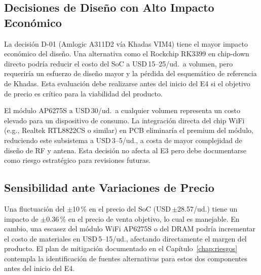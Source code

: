 \subsection{Decisiones de Diseño con Alto Impacto Económico}

\begin{decisbox}
  La decisión D-01 (Amlogic A311D2 vía Khadas VIM4) tiene el mayor impacto
  económico del diseño. Una alternativa como el Rockchip RK3399 en chip-down
  directo podría reducir el costo del SoC a USD\,15--25/ud.~a volumen, pero
  requeriría un esfuerzo de diseño mayor y la pérdida del esquemático de
  referencia de Khadas. Esta evaluación debe realizarse antes del inicio del
  E4 si el objetivo de precio es crítico para la viabilidad del producto.
\end{decisbox}

\begin{decisbox}
  El módulo AP6275S a USD\,30/ud.~a cualquier volumen representa un costo
  elevado para un dispositivo de consumo. La integración directa del chip
  WiFi (e.g., Realtek RTL8822CS o similar) en PCB eliminaría el premium del
  módulo, reduciendo este subsistema a USD\,3--5/ud., a costa de mayor
  complejidad de diseño de RF y antena. Esta decisión no afecta al E3 pero
  debe documentarse como riesgo estratégico para revisiones futuras.
\end{decisbox}

\subsection{Sensibilidad ante Variaciones de Precio}

Una fluctuación del $\pm$10\,\% en el precio del SoC (USD\,$\pm$28.57/ud.)
tiene un impacto de $\pm$0.36\,\% en el precio de venta objetivo, lo cual es
manejable. En cambio, una escasez del módulo WiFi AP6275S o del DRAM podría
incrementar el costo de materiales en USD\,5--15/ud., afectando directamente
el margen del producto. El plan de mitigación documentado en el
Capítulo~\ref{chap:riesgos} contempla la identificación de fuentes
alternativas para estos dos componentes antes del inicio del E4.

